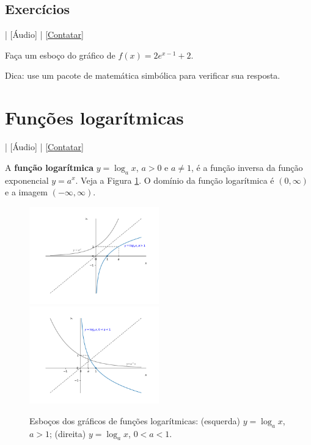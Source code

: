 \subsection*{Exercícios}

\begin{flushright}
  [Vídeo] | [Áudio] | \href{https://phkonzen.github.io/notas/contato.html}{[Contatar]}
\end{flushright}

\begin{exer}
  Faça um esboço do gráfico de $f(x) = 2e^{x-1}+2$.
\end{exer}
\begin{resp}
  Dica: use um pacote de matemática simbólica para verificar sua resposta.
\end{resp}

\section{Funções logarítmicas}\label{cap_funcao_sec_funlog}

\begin{flushright}
  [Vídeo] | [Áudio] | \href{https://phkonzen.github.io/notas/contato.html}{[Contatar]}
\end{flushright}

A {\bf função logarítmica} $y = \log_a x$, $a>0$ e $a\neq 1$, é a função inversa da função exponencial $y = a^x$. Veja a Figura \ref{fig:log_graficos}. O domínio da função logarítmica é $(0,\infty)$ e a imagem $(-\infty, \infty)$.

\begin{figure}[H]
  \centering
  \includegraphics[width=0.5\textwidth]{./cap_funcao/dados/fig_log_graficos/fig_log_2}~
  \includegraphics[width=0.5\textwidth]{./cap_funcao/dados/fig_log_graficos/fig_log_12}
  \caption{Esboços dos gráficos de funções logarítmicas: (esquerda) $y = \log_a x$, $a>1$; (direita) $y = \log_a x$, $0<a<1$.}
  \label{fig:log_graficos}
\end{figure}

